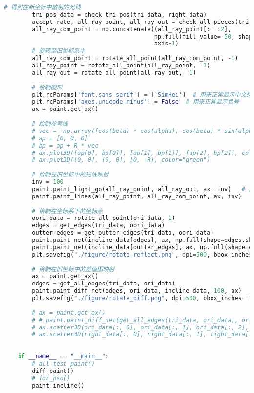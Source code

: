 \documentclass[withoutpreface,bwprint,fontset=macnew]{cumcmthesis} %
\begin{document}
\begin{appendices}
\begin{lstlisting}[language=python]
	    # 得到在新坐标中散射的光线
	    tri_pos_data = check_tri_pos(tri_data, right_data)
	    accept_rate, all_ray_point, all_ray_out = check_all_pieces(tri_pos_data)
	    all_ray_com_point = np.concatenate((all_ray_point[:, :2],
	                                       np.full(fill_value=-50, shape=(all_ray_point.shape[0], 1))),
	                                       axis=1)
	    # 旋转至旧坐标系中
	    all_ray_com_point = rotate_all_point(all_ray_com_point, -1)
	    all_ray_point = rotate_all_point(all_ray_point, -1)
	    all_ray_out = rotate_all_point(all_ray_out, -1)
	
	    # 绘制图形
	    plt.rcParams['font.sans-serif'] = ['SimHei']  # 用来正常显示中文标签
	    plt.rcParams['axes.unicode_minus'] = False  # 用来正常显示负号
	    ax = paint.get_ax()
	
	    # 绘制参考线
	    # vec = -np.array([cos(beta) * cos(alpha), cos(beta) * sin(alpha), sin(beta)])
	    # ap = [0, 0, 0]
	    # bp = ap + R * vec
	    # ax.plot3D([ap[0], bp[0]], [ap[1], bp[1]], [ap[2], bp[2]], color="red")
	    # ax.plot3D([0, 0], [0, 0], [0, -R], color="green")
	
	    # 绘制在旧坐标中的光线映射
	    inv = 100
	    paint.paint_light_go(all_ray_point, all_ray_out, ax, inv)   # 离开的光线
	    paint.paint_lines(all_ray_point, all_ray_com_point, ax, inv)
	
	    # 绘制在坐标系下的坐标点
	    oori_data = rotate_all_point(ori_data, 1)
	    edges = get_edges(tri_data, oori_data)
	    outter_edges = get_outter_edges(tri_data, oori_data)
	    paint.paint_net(incline_data[edges], ax, np.full(shape=edges.shape[0], fill_value=10))
	    paint.paint_net(incline_data[outter_edges], ax, np.full(shape=outter_edges.shape[0], fill_value=9))
	    plt.savefig("./figure/rotate_reflect.png", dpi=500, bbox_inches='tight')
	
	    # 绘制在旧坐标中的差值图映射
	    ax = paint.get_ax()
	    edges = get_all_edges(tri_data, ori_data)
	    paint.paint_diff_net(edges, ori_data, incline_data, 100, ax)
	    plt.savefig("./figure/rotate_diff.png", dpi=500, bbox_inches='tight')
	
	    # ax = paint.get_ax()
	    # # paint.paint_diff_net(get_all_edges(tri_data, ori_data), ori_data, right_data, 1, ax)
	    # ax.scatter3D(ori_data[:, 0], ori_data[:, 1], ori_data[:, 2], s=0.3, color="orange")
	    # ax.scatter3D(right_data[:, 0], right_data[:, 1], right_data[:, 2], s=0.3, color="blue")
	
	
	if __name__ == "__main__":
	    # all_test_paint()
	    diff_paint()
	    # for_pso()
	    paint_incline()


\end{lstlisting}
\end{appendices}
\end{document}
